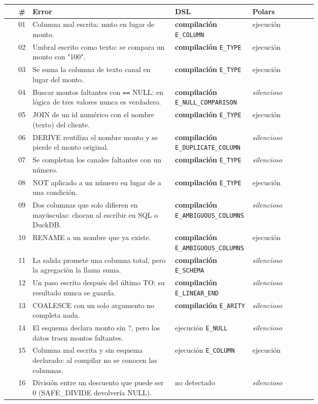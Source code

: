 \begin{tabular}{@{}rp{0.46\linewidth}p{0.25\linewidth}l@{}}
\toprule
\# & Error & DSL & Polars \\
\midrule
01 & Columna mal escrita: mnto en lugar de monto. & \textbf{compilación} {\scriptsize\texttt{E\_COLUMN}} & ejecución \\
02 & Umbral escrito como texto: se compara un monto con "100". & \textbf{compilación} {\scriptsize\texttt{E\_TYPE}} & ejecución \\
03 & Se suma la columna de texto canal en lugar del monto. & \textbf{compilación} {\scriptsize\texttt{E\_TYPE}} & ejecución \\
04 & Buscar montos faltantes con \texttt{==} NULL: en lógica de tres valores nunca es verdadero. & \textbf{compilación} {\scriptsize\texttt{E\_NULL\_COMPARISON}} & \emph{silencioso} \\
05 & JOIN de un id numérico con el nombre (texto) del cliente. & \textbf{compilación} {\scriptsize\texttt{E\_TYPE}} & ejecución \\
06 & DERIVE reutiliza el nombre monto y se pierde el monto original. & \textbf{compilación} {\scriptsize\texttt{E\_DUPLICATE\_COLUMN}} & \emph{silencioso} \\
07 & Se completan los canales faltantes con un número. & \textbf{compilación} {\scriptsize\texttt{E\_TYPE}} & \emph{silencioso} \\
08 & NOT aplicado a un número en lugar de a una condición. & \textbf{compilación} {\scriptsize\texttt{E\_TYPE}} & ejecución \\
09 & Dos columnas que solo difieren en mayúsculas: chocan al escribir en SQL o DuckDB. & \textbf{compilación} {\scriptsize\texttt{E\_AMBIGUOUS\_COLUMNS}} & \emph{silencioso} \\
10 & RENAME a un nombre que ya existe. & \textbf{compilación} {\scriptsize\texttt{E\_AMBIGUOUS\_COLUMNS}} & ejecución \\
11 & La salida promete una columna total, pero la agregación la llama suma. & \textbf{compilación} {\scriptsize\texttt{E\_SCHEMA}} & \emph{silencioso} \\
12 & Un paso escrito después del último TO: su resultado nunca se guarda. & \textbf{compilación} {\scriptsize\texttt{E\_LINEAR\_END}} & \emph{silencioso} \\
13 & COALESCE con un solo argumento no completa nada. & \textbf{compilación} {\scriptsize\texttt{E\_ARITY}} & \emph{silencioso} \\
14 & El esquema declara monto sin ?, pero los datos traen montos faltantes. & ejecución {\scriptsize\texttt{E\_NULL}} & \emph{silencioso} \\
15 & Columna mal escrita y sin esquema declarado: al compilar no se conocen las columnas. & ejecución {\scriptsize\texttt{E\_COLUMN}} & ejecución \\
16 & División entre un descuento que puede ser 0 (SAFE\_DIVIDE devolvería NULL). & no detectado & \emph{silencioso} \\
\bottomrule
\end{tabular}